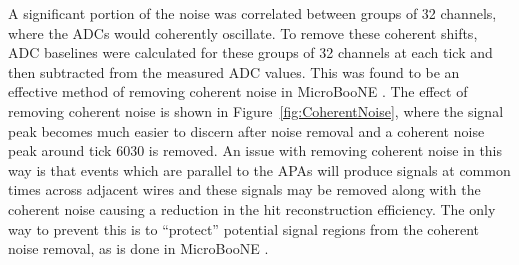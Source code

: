 A significant portion of the noise was correlated between groups of 32 channels, where the ADCs would coherently oscillate. To remove these coherent shifts, ADC baselines were calculated for these groups of 32 channels at each tick and then subtracted from the measured ADC values. This was found to be an effective method of removing coherent noise in MicroBooNE \citep{uBooNENoise}. The effect of removing coherent noise is shown in Figure~\ref{fig:CoherentNoise}, where the signal peak becomes much easier to discern after noise removal and a coherent noise peak around tick 6030 is removed. An issue with removing coherent noise in this way is that events which are parallel to the APAs will produce signals at common times across adjacent wires and these signals may be removed along with the coherent noise causing a reduction in the hit reconstruction efficiency. The only way to prevent this is to ``protect'' potential signal regions from the coherent noise removal, as is done in MicroBooNE \citep{uBooNENoise}. \\

